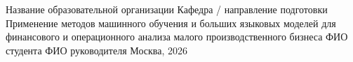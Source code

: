 \documentclass{coursework}
\begin{document}
\courseworktitlepage
  {Название образовательной организации}
  {Кафедра / направление подготовки}
  {Применение методов машинного обучения и больших языковых моделей для финансового и операционного анализа малого производственного бизнеса}
  {ФИО студента}
  {ФИО руководителя}
  {Москва, 2026}

\tableofcontents
\clearpage










\nocite{*}
\printbibliography

\appendix

\end{document}
